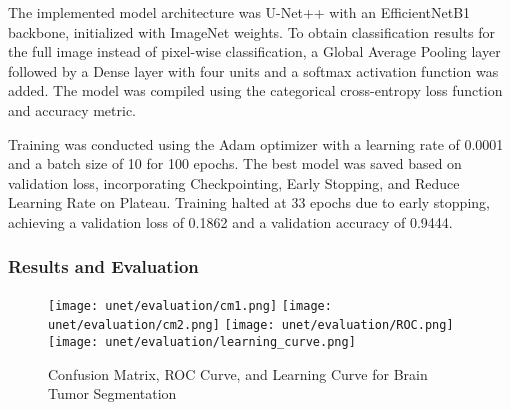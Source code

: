 The implemented model architecture was U-Net++ with an EfficientNetB1 backbone, initialized with ImageNet weights. To obtain classification results for the full image instead of pixel-wise classification, a Global Average Pooling layer followed by a Dense layer with four units and a softmax activation function was added. The model was compiled using the categorical cross-entropy loss function and accuracy metric.

Training was conducted using the Adam optimizer with a learning rate of 0.0001 and a batch size of 10 for 100 epochs. The best model was saved based on validation loss, incorporating Checkpointing, Early Stopping, and Reduce Learning Rate on Plateau. Training halted at 33 epochs due to early stopping, achieving a validation loss of 0.1862 and a validation accuracy of 0.9444.

\subsubsection{Results and Evaluation}

\begin{figure}[H]
  \begin{center}
    \texttt{[image: unet/evaluation/cm1.png]}
    \texttt{[image: unet/evaluation/cm2.png]}
    \texttt{[image: unet/evaluation/ROC.png]}
    \texttt{[image: unet/evaluation/learning\_curve.png]}
  \end{center}
  \caption{Confusion Matrix, ROC Curve, and Learning Curve for Brain Tumor Segmentation}\label{f:unet_evaluation}
\end{figure}

